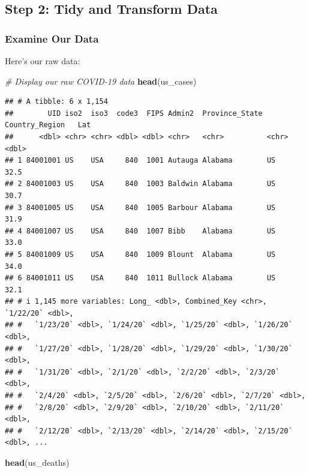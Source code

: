 \documentclass[
]{article}
\newenvironment{Shaded}{\begin{snugshade}}{\end{snugshade}}
\newcommand{\CommentTok}[1]{\textcolor[rgb]{0.56,0.35,0.01}{\textit{#1}}}
\newcommand{\FunctionTok}[1]{\textcolor[rgb]{0.13,0.29,0.53}{\textbf{#1}}}
\newcommand{\NormalTok}[1]{#1}
\begin{document}
\subsection{Step 2: Tidy and Transform
Data}\label{step-2-tidy-and-transform-data}

\subsubsection{Examine Our Data}\label{examine-our-data}

Here's our raw data:

\begin{Shaded}
\begin{Highlighting}[]
\CommentTok{\# Display our raw COVID{-}19 data}
\FunctionTok{head}\NormalTok{(us\_cases)}
\end{Highlighting}
\end{Shaded}

\begin{verbatim}
## # A tibble: 6 x 1,154
##        UID iso2  iso3  code3  FIPS Admin2  Province_State Country_Region   Lat
##      <dbl> <chr> <chr> <dbl> <dbl> <chr>   <chr>          <chr>          <dbl>
## 1 84001001 US    USA     840  1001 Autauga Alabama        US              32.5
## 2 84001003 US    USA     840  1003 Baldwin Alabama        US              30.7
## 3 84001005 US    USA     840  1005 Barbour Alabama        US              31.9
## 4 84001007 US    USA     840  1007 Bibb    Alabama        US              33.0
## 5 84001009 US    USA     840  1009 Blount  Alabama        US              34.0
## 6 84001011 US    USA     840  1011 Bullock Alabama        US              32.1
## # i 1,145 more variables: Long_ <dbl>, Combined_Key <chr>, `1/22/20` <dbl>,
## #   `1/23/20` <dbl>, `1/24/20` <dbl>, `1/25/20` <dbl>, `1/26/20` <dbl>,
## #   `1/27/20` <dbl>, `1/28/20` <dbl>, `1/29/20` <dbl>, `1/30/20` <dbl>,
## #   `1/31/20` <dbl>, `2/1/20` <dbl>, `2/2/20` <dbl>, `2/3/20` <dbl>,
## #   `2/4/20` <dbl>, `2/5/20` <dbl>, `2/6/20` <dbl>, `2/7/20` <dbl>,
## #   `2/8/20` <dbl>, `2/9/20` <dbl>, `2/10/20` <dbl>, `2/11/20` <dbl>,
## #   `2/12/20` <dbl>, `2/13/20` <dbl>, `2/14/20` <dbl>, `2/15/20` <dbl>, ...
\end{verbatim}

\begin{Shaded}
\begin{Highlighting}[]
\FunctionTok{head}\NormalTok{(us\_deaths)}
\end{Highlighting}
\end{Shaded}
\end{document}
